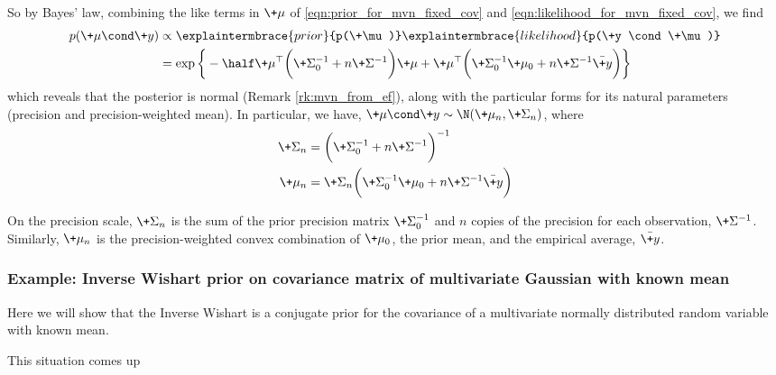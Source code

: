 \documentclass{article} %
\begin{document}
So by Bayes' law, combining the like terms in $\+\mu$ of \eqref{eqn:prior_for_mvn_fixed_cov} and \eqref{eqn:likelihood_for_mvn_fixed_cov}, we find
\begin{align*}
 p(\+\mu \cond \+y) &\propto \explaintermbrace{prior}{p(\+\mu)}\explaintermbrace{likelihood}{p(\+y \cond \+\mu)} \\
 &= \exp \bigg\{ - \half \+\mu^\top \bigg( \+\Sigma_0^{-1} + n  \+\Sigma^{-1}\bigg)  \+\mu + \+\mu^\top \bigg( \+\Sigma_0^{-1} \+\mu_0 + n \+\Sigma^{-1} \bar{\+y} \bigg) \bigg\} 
\end{align*}
which reveals that the posterior is normal (Remark \ref{rk:mvn_from_ef}), along with the particular forms for its natural parameters (precision and precision-weighted mean).  In particular, we have, $\+\mu \cond \+y \sim \N(\+\mu_n, \+\Sigma_n)$, where
\begin{align*}
	\+\Sigma_n &= \bigg( \+\Sigma_0^{-1} + n \+\Sigma^{-1}\bigg)^{-1} \\
	\+\mu_n &= \+\Sigma_n \bigg(\+\Sigma_0^{-1} \+\mu_0 + n \+\Sigma^{-1} \bar{\+y}  \bigg)
\end{align*}

On the precision scale,  $\+\Sigma_n$ is the sum of the prior precision matrix $\+\Sigma_0^{-1}$ and $n$ copies of the precision for each observation,  $\+\Sigma^{-1}$.    Similarly,  $\+\mu_n$ is the precision-weighted convex combination of $\+\mu_0$, the prior mean, and the empirical average, $\bar{\+y}$.

\subsubsection{Example:  Inverse Wishart prior on covariance matrix of multivariate Gaussian with known mean} \label{sec:inverse_wishart_prior_on_mvn_with_known_mean}
 
Here we will show that the Inverse Wishart is a conjugate prior for the covariance of a multivariate normally distributed random variable with known mean.

This situation comes up 
\end{document}
